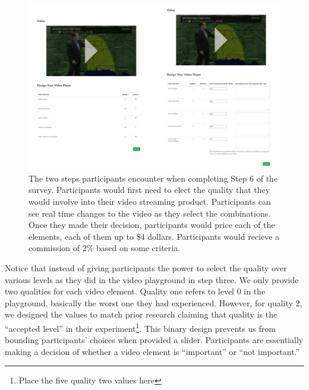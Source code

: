 \begin{figure}[htpb]
    \centering
    \includegraphics[width=\textwidth, keepaspectratio=true]{content/image/design_task.png}
    \caption{
        The two steps participants encounter when completing Step 6 of the survey. Participants would first need to elect the quality that they would involve into their video streaming product. Participants can see real time changes to the video as they select the combinations. Once they made their decision, participants would price each of the elements, each of them up to \$4 dollars. Participants would recieve a commission of 2\% based on some criteria.
    }
    \label{fig:exp2_store}
\end{figure}

Notice that instead of giving participants the power to select the quality over various levels as they did in the video playground in step three. We only provide two qualities for each video element. Quality one refers to level 0 in the playground, basically the worst one they had experienced. However, for quality 2, we designed the values to match prior research claiming that quality is the ``accepted level'' in their experiment\footnote{Place the five quality two values here}. This binary design prevents us from bounding participants' choices when provided a slider. Participants are essentially making a decision of whether a video element is ``important'' or ``not important.''

